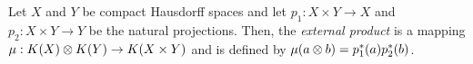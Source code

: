 \documentclass[../sean_thesis.tex]{subfiles}
\begin{document}

\begin{definition}
	Let $X$ and $Y$ be compact Hausdorff spaces and let $p_1: X\times Y \to X$ and $p_2: X \times Y \to Y$ be the natural projections. Then, the \emph{external product} is a mapping $\mu: K(X) \otimes K(Y) \to K(X \times Y)$ and is defined by $\mu(a \otimes b) = p_1^{*}(a) p_2^{*}(b)$.
\end{definition}



%
%
\end{document}
